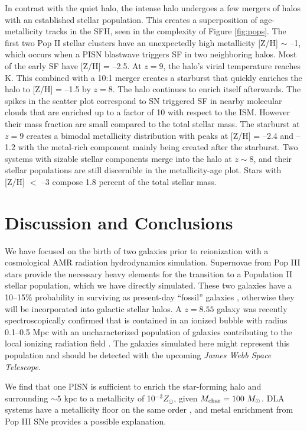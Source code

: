 \documentclass[apjl]{emulateapj}
\begin{document}
In contrast with the quiet halo, the intense halo undergoes a few
mergers of halos with an established stellar population.  This creates
a superposition of age-metallicity tracks in the SFH, seen in the
complexity of Figure \ref{fig:pops}.  The first two Pop II stellar
clusters have an unexpectedly high metallicity [Z/H] $\sim$ --1, which
occurs when a PISN blastwave triggers SF in two neighboring halos.
Most of the early SF have [Z/H] = --2.5.  At $z=9$, the halo's virial
temperature reaches  K.  This combined with a 10:1 merger
creates a starburst that quickly enriches the halo to [Z/H] = --1.5 by
$z=8$.  The halo continues to enrich itself afterwards.  The spikes in
the scatter plot correspond to SN triggered SF in nearby molecular
clouds that are enriched up to a factor of 10 with respect to the ISM.
However their mass fraction are small compared to the total stellar
mass.  The starburst at $z=9$ creates a bimodal metallicity
distribution with peaks at [Z/H] = --2.4 and --1.2 with the metal-rich
component mainly being created after the starburst.  Two systems with
sizable stellar components merge into the halo at $z \sim 8$, and
their stellar populations are still discernible in the metallicity-age
plot.  Stars with [Z/H] $<$ --3 compose 1.8 percent of the total
stellar mass.

\section{Discussion and Conclusions}

We have focused on the birth of two galaxies prior to reionization
with a cosmological AMR radiation hydrodynamics simulation.
Supernovae from Pop III stars provide the necessary heavy elements for
the transition to a Population II stellar population, which we have
directly simulated.  These two galaxies have a 10--15\% probability in
surviving as present-day ``fossil'' galaxies \citep{Gnedin06},
otherwise they will be incorporated into galactic stellar halos.  A
$z=8.55$ galaxy was recently spectroscopically confirmed that is
contained in an ionized bubble with radius 0.1--0.5 Mpc with an
uncharacterized population of galaxies contributing to the local
ionizing radiation field \citep{Lehnert10_z8.6}.  The galaxies
simulated here might represent this population and should be detected
with the upcoming \textit{James Webb Space Telescope}.

We find that one PISN is sufficient to enrich the star-forming halo
and surrounding $\sim 5$ kpc to a metallicity of 10$^{-3} Z_\odot$,
given $M_{\rm char} = 100~\Ms$.  DLA systems have a metallicity floor
on the same order \citep{Wolfe05_Review}, and metal enrichment from Pop
III SNe provides a possible explanation.
\end{document}
